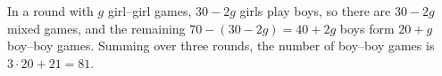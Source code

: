 In a round with $g$ girl--girl games, $30-2g$ girls play boys, so there are $30-2g$ mixed games, and the remaining $70-(30-2g)=40+2g$ boys form $20+g$ boy--boy games. Summing over three rounds, the number of boy--boy games is $3\cdot20+21=\boxed{81}$.
